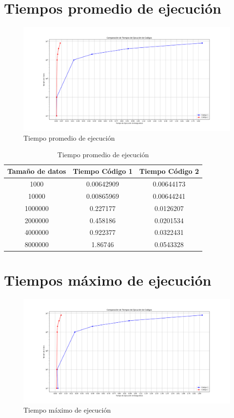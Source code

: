 \documentclass[11pt]{report}
\begin{document}
\section{Tiempos promedio de ejecución}
\begin{figure}[H]
  \centering
  \includegraphics[scale=0.35]{img/mean_times.png}
  \caption{Tiempo promedio de ejecución}
  \label{fig:tiempo promedio de ejecución}
\end{figure}

\begin{table}[H]
  \centering
  \begin{tabular}{|c|c|c|}
    \hline
    \textbf{Tamaño de datos} & \textbf{Tiempo Código 1} & \textbf{Tiempo Código 2} \\ \hline
    1000 & 0.00642909 & 0.00644173 \\ \hline
    10000 & 0.00865969 & 0.00644241 \\ \hline
    1000000 & 0.227177 & 0.0126207 \\ \hline
    2000000 & 0.458186 & 0.0201534 \\ \hline
    4000000 & 0.922377 & 0.0322431 \\ \hline
    8000000 & 1.86746 & 0.0543328 \\ \hline
  \end{tabular}
  \caption{Tiempo promedio de ejecución}
  \label{tab:tiempo promedio de ejecución}
\end{table}

\section{Tiempos máximo de ejecución}
\begin{figure}[H]
  \centering
  \includegraphics[scale=0.35]{img/max_times.png}
  \caption{Tiempo máximo de ejecución}
  \label{fig:tiempo máximo de ejecución}
\end{figure}
\end{document}
